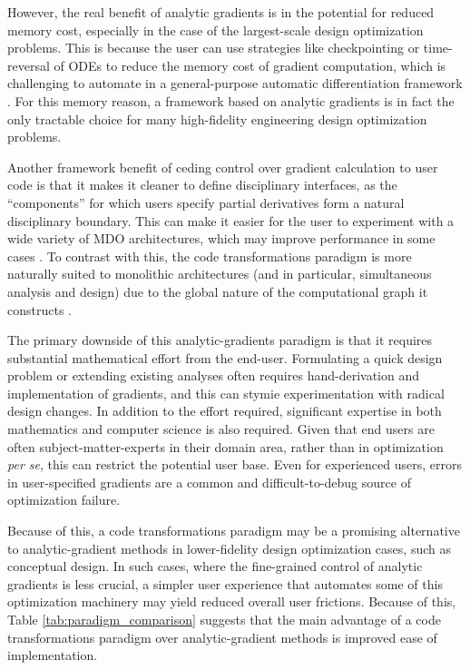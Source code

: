 However, the real benefit of analytic gradients is in the potential for reduced memory cost, especially in the case of the largest-scale design optimization problems. This is because the user can use strategies like checkpointing or time-reversal of ODEs to reduce the memory cost of gradient computation, which is challenging to automate in a general-purpose automatic differentiation framework \cite{chen2018neural, rackauckas_direct_2022, griewank_algorithm_2000}. For this memory reason, a framework based on analytic gradients is in fact the only tractable choice for many high-fidelity engineering design optimization problems.

Another framework benefit of ceding control over gradient calculation to user code is that it makes it cleaner to define disciplinary interfaces, as the ``components'' for which users specify partial derivatives form a natural disciplinary boundary. This can make it easier for the user to experiment with a wide variety of MDO architectures, which may improve performance in some cases \cite{martins_multidisciplinary_2013}. To contrast with this, the code transformations paradigm is more naturally suited to monolithic architectures (and in particular, simultaneous analysis and design) due to the global nature of the computational graph it constructs \cite{ma_modelingtoolkit_2021, haftka_simultaneous_1985}.

The primary downside of this analytic-gradients paradigm is that it requires substantial mathematical effort from the end-user. Formulating a quick design problem or extending existing analyses often requires hand-derivation and implementation of gradients, and this can stymie experimentation with radical design changes. In addition to the effort required, significant expertise in both mathematics and computer science is also required. Given that end users are often subject-matter-experts in their domain area, rather than in optimization \emph{per se}, this can restrict the potential user base. Even for experienced users, errors in user-specified gradients are a common and difficult-to-debug source of optimization failure.



Because of this, a code transformations paradigm may be a promising alternative to analytic-gradient methods in lower-fidelity design optimization cases, such as conceptual design. In such cases, where the fine-grained control of analytic gradients is less crucial, a simpler user experience that automates some of this optimization machinery may yield reduced overall user frictions. Because of this, Table \ref{tab:paradigm_comparison} suggests that the main advantage of a code transformations paradigm over analytic-gradient methods is improved ease of implementation.

